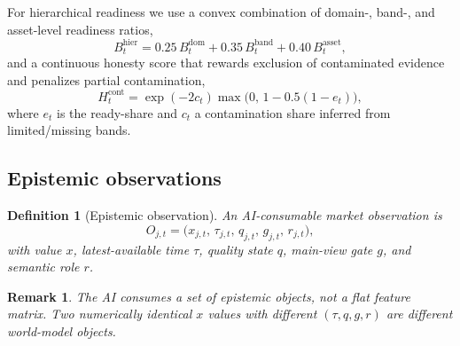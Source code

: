 \documentclass[12pt]{article}
\newtheorem{definition}{Definition}
\newtheorem{remark}{Remark}
\begin{document}
For hierarchical readiness we use a convex combination of domain-, band-, and asset-level readiness ratios,
\begin{equation}
B^{\mathrm{hier}}_t=0.25\,B^{\mathrm{dom}}_t+0.35\,B^{\mathrm{band}}_t+0.40\,B^{\mathrm{asset}}_t,
\label{eq:bhier}
\end{equation}
and a continuous honesty score that rewards exclusion of contaminated evidence and penalizes partial contamination,
\begin{equation}
H^{\mathrm{cont}}_t=\exp(-2c_t)\max\!\bigl(0,\,1-0.5(1-e_t)\bigr),
\label{eq:hcont}
\end{equation}
where $e_t$ is the ready-share and $c_t$ a contamination share inferred from limited/missing bands.

\subsection{Epistemic observations}
\begin{definition}[Epistemic observation]
An AI-consumable market observation is
\begin{equation}
O_{j,t}=\bigl(x_{j,t},\,\tau_{j,t},\,q_{j,t},\,g_{j,t},\,r_{j,t}\bigr),
\label{eq:obs}
\end{equation}
with value $x$, latest-available time $\tau$, quality state $q$, main-view gate $g$, and semantic role $r$.
\end{definition}

\begin{remark}
The AI consumes a set of epistemic objects, not a flat feature matrix. Two numerically identical $x$ values with different $(\tau,q,g,r)$ are different world-model objects.
\end{remark}
\end{document}
